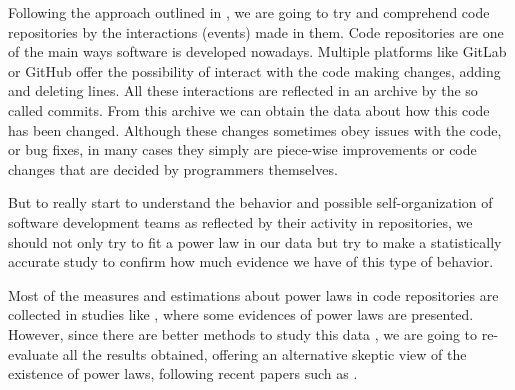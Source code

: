 \documentclass{article}
\begin{document}
Following the approach outlined in 
\cite{merelo16:self,Merelo2016:repomining,merelo17vue,DBLP:conf/iwann/MereloCV17,merelo2017self}, we are going to try and comprehend code repositories by the
interactions (events) made in them. Code repositories are one of the
main ways software is developed nowadays. Multiple platforms like
GitLab or GitHub offer the possibility of interact with the code
making changes, adding and deleting lines.  All these interactions are
reflected in an archive by the so called commits. From this archive we
can obtain the data about how this code has been changed. Although
these changes sometimes obey issues with the code, or bug fixes, in
many cases they simply are piece-wise improvements or code changes that
are decided by programmers themselves.

But to really start to understand the behavior and possible
self-organization of software development teams as reflected by their
activity in repositories, we should not only try to fit a power law in
our data but try to make a statistically accurate study to confirm how
much evidence we have of this type of behavior.

Most of the measures and estimations about power laws in code
repositories are collected in studies like \cite{merelo2017self},
where some evidences of power laws are presented.  However, since
there are better methods to study this data \cite{clauset2009power},
we are going to re-evaluate all the results obtained, offering an
alternative skeptic view of the existence of power laws, following
recent papers such as \cite{Holme2019,Broido2019}.
\end{document}
